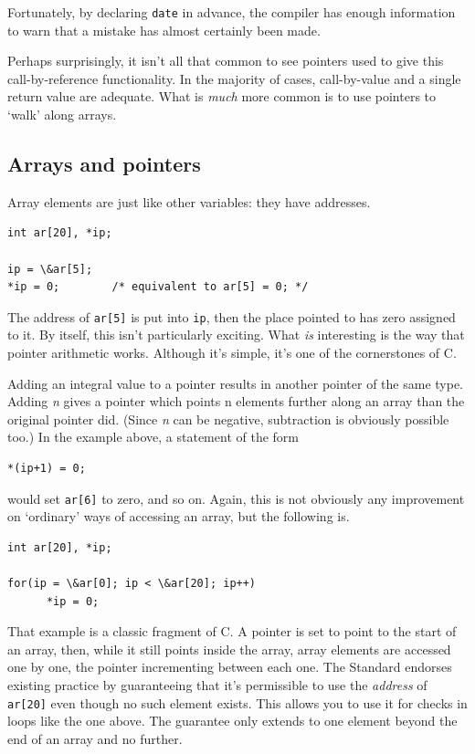    Fortunately, by declaring \texttt{date} in advance, the compiler
    has enough information to warn that a mistake has almost certainly been
    made.


   Perhaps surprisingly, it isn't all that common to see pointers used to
    give this call-by-reference functionality. In the majority of cases,
    call-by-value and a single return value are adequate. What is
    \textit{much} more common is to use pointers to `walk' along
    arrays.


  

  \subsection{Arrays and pointers}
   

   Array elements are just like other variables: they have addresses.


   \begin{Verbatim}
int ar[20], *ip;

ip = \&ar[5];
*ip = 0;        /* equivalent to ar[5] = 0; */
\end{Verbatim}

   The address of \texttt{ar[5]} is put into \texttt{ip}, then
    the place pointed to has zero assigned to it. By itself, this isn't
    particularly exciting. What \textit{is} interesting is the way that
    pointer arithmetic works. Although it's simple, it's one of the
    cornerstones of C.


   Adding an integral value to a pointer results in another pointer of
    the same type. Adding \textit{n} gives a pointer which points n elements
    further along an array than the original pointer did. (Since \textit{n}
    can be negative, subtraction is obviously possible too.) In the example
    above, a statement of the form


   \begin{Verbatim}
*(ip+1) = 0;
\end{Verbatim}

   would set \texttt{ar[6]} to zero, and so on. Again, this is not
    obviously any improvement on `ordinary' ways of accessing an
    array, but the following is.


   \begin{Verbatim}
int ar[20], *ip;

for(ip = \&ar[0]; ip < \&ar[20]; ip++)
      *ip = 0;
\end{Verbatim}

   That example is a classic fragment of C. A pointer is set to
    point to the start of an array, then, while it still points inside the
    array, array elements are accessed one by one, the pointer incrementing
    between each one. The Standard endorses existing practice by
    guaranteeing that it's permissible to use the \textit{address} of
    \texttt{ar[20]} even though no such element exists. This allows you
    to use it for checks in loops like the one above. The guarantee only
    extends to one element beyond the end of an array and no further.



